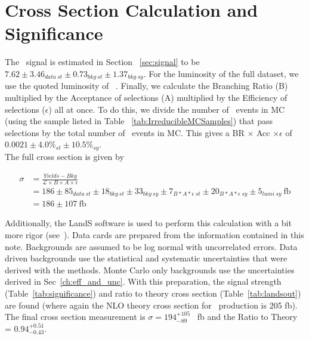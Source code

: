 	\section{Cross Section Calculation and Significance}
	The \ttZ \ signal is estimated in Section ~\ref{sec:signal} to be $7.62 \pm 3.46_{data\ st} \pm 0.73_{bkg\ st} \pm 1.37_{bkg\ sy}$. For the luminosity of the full dataset, we use the quoted luminosity of \intLumiwError~\cite{lumi12up}. Finally, we calculate the Branching Ratio (B) multiplied by the Acceptance of selections (A) multiplied by the Efficiency of selections ($\epsilon$) all at once. To do this, we divide the number of \ttZ \ events in MC (using the sample listed in Table ~\ref{tab:IrreducibleMCSamples}) that pass selections by the total number of \ttZ \ events in MC. This gives a BR $\times$ Acc $\times \epsilon$ of $0.0021 \pm 4.0\% _{st} \pm 10.5\% _{sy}$.\\

The full cross section is given by 

\begin{align}
         \sigma &= \frac{Yields - Bkg}{\mathcal{L} \times B \times A\times \epsilon}\\
                      &=  186 \pm 85_{data\ st} \pm 18_{bkg\ st} \pm 33_{bkg\ sy}\pm 7_{B*A*\epsilon\ st} \pm 20_{B*A*\epsilon\ sy} \pm 5_{lumi\ sy}\ \text{fb}\\
                      &= 186 \pm 107\ \text{fb}
\end{align}
          
          
 Additionally, the LandS software is used to perform this calculation with a bit more rigor (see~\cite{higgscomb}). Data cards are prepared from the information contained in this note. Backgrounds are assumed to be log normal with uncorrelated errors. Data driven backgrounds use the statistical and systematic uncertainties that were derived with the methods. Monte Carlo only backgrounds use the uncertainties derived in Sec~\ref{ch:eff_and_unc}. With this preparation, the signal strength (Table~\ref{tab:significance}) and ratio to theory cross section (Table~\ref{tab:landsout}) are found (where again the NLO theory cross section for \ttZ \ production is 205 fb). The final cross section measurement is $\sigma=194 _{-89} ^{+105}$ \ fb and the Ratio to Theory = $0.94 _{-0.43} ^{+0.51}$.\\
 
